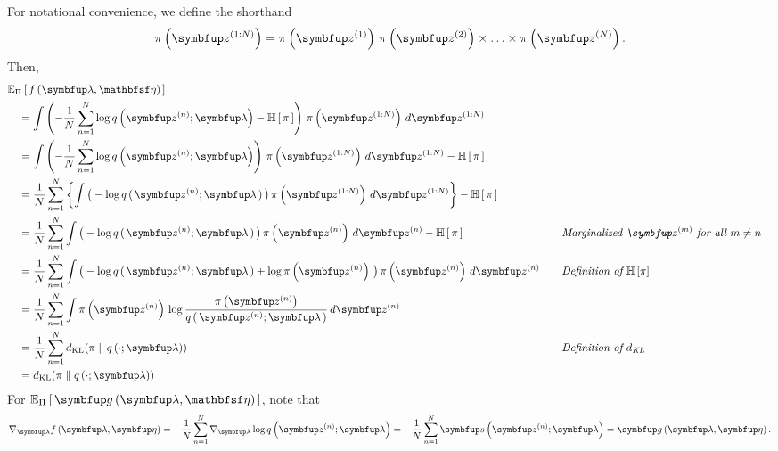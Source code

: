 \begin{proofEnd}
  For notational convenience, we define the shorthand
  \begin{align*}
    \pi\left(\vz^{(1:N)}\right) = \pi\left(\vz^{(1)}\right) \, \pi\left(\vz^{(2)}\right) \times \ldots \times \pi\left(\vz^{(N)}\right).
  \end{align*}
  Then,
  \begin{alignat}{2}
    &\Esub{\Pi}{ f\left(\vlambda, \rvveta\right) }
    \nonumber
    \\
    &\quad=
    \int \left(- \frac{1}{N} \sum^{N}_{n=1} \log q\left(\vz^{(n)}; \vlambda\right) - \mathbb{H}\left[\,\pi\,\right]\right) \, \pi\left(\vz^{(1:N)}\right) \, d\vz^{(1:N)}
    \nonumber
    \\
    &\quad=
    \int \left(- \frac{1}{N} \sum^{N}_{n=1} \log q\left(\vz^{(n)}; \vlambda\right)\right) \, \pi\left(\vz^{(1:N)}\right) \, d\vz^{(1:N)} - \mathbb{H}\left[\,\pi\,\right]
    \nonumber
    \\
    &\quad=
     \frac{1}{N} \sum^{N}_{n=1} \left\{ \int \big(-\log q\,(\,\vz^{(n)}; \vlambda\,)\,\big) \, \pi\left(\vz^{(1:N)}\right) \, d\vz^{(1:N)} \right\} - \mathbb{H}\,[\,\pi\,] 
    \nonumber
    \\
    &\quad=
    \frac{1}{N} \sum^{N}_{n=1} \int \big( -\log q\,(\,\vz^{(n)}; \vlambda\,) \,\big) \, \pi\left(\vz^{(n)}\right) \, d\vz^{(n)} - \mathbb{H}\,[\,\pi\,]
    &&\quad{\text{\textit{Marginalized \(\vz^{(m)}\) for all \(m \neq n\)}}}
    \nonumber
    \\
    &\quad=
    \frac{1}{N} \sum^{N}_{n=1} \int \big( -\log q\,(\,\vz^{(n)}; \vlambda\,) + \log\pi\left(\vz^{(n)}\right) \,\big) \, \pi\left(\vz^{(n)}\right) \, d\vz^{(n)}
    &&\quad{\text{\textit{Definition of \(\mathbb{H}\left[\pi\right]\)}}}
    \nonumber
    \\
    &\quad=
    \frac{1}{N} \sum^{N}_{n=1} \int \pi\left(\vz^{(n)}\right) \, \log \frac{\pi\left(\vz^{(n)}\right)}{q\,(\,\vz^{(n)}; \vlambda\,)}  \, d\vz^{(n)}
    \nonumber
    \\
    &\quad=
    \frac{1}{N} \sum^{N}_{n=1} \DKL{\pi}{q\left(\cdot; \vlambda\right)}
    \nonumber
    &&\quad{\text{\textit{Definition of \(d_{\text{KL}}\)}}}
    \\
    &\quad=
    \DKL{\pi}{q\left(\cdot; \vlambda\right)}\label{eq:F_KL}
  \end{alignat}
  For \(\Esub{\Pi}{ \vg\left(\vlambda, \rvveta\right) }\), note that 
  \begin{align}
    \nabla_{\vlambda} f\left(\vlambda, \veta\right) = -\frac{1}{N} \sum^{N}_{n=1} \nabla_{\vlambda} \log q\left(\vz^{(n)}; \vlambda\right) = -\frac{1}{N} \sum^{N}_{n=1} \vs\left(\vz^{(n)}; \vlambda\right) = \vg\left(\vlambda, \veta\right).\label{eq:F_grad_G}

\end{align}
\end{proofEnd}
